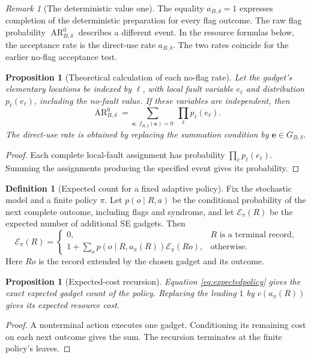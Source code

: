 \documentclass[11pt,a4paper]{article}
\newtheorem{proposition}[theorem]{Proposition}
\theoremstyle{definition}
\newtheorem{definition}[theorem]{Definition}
\theoremstyle{remark}
\newtheorem{remark}[theorem]{Remark}
\begin{document}
\begin{remark}[The deterministic value one]
The equality $a_{B,\delta}=1$ expresses completion of the deterministic
preparation for every flag outcome. The raw flag probability
$\operatorname{AR}^{0}_{B,\delta}$ describes a different event.
In the resource formulas below, the acceptance rate is the direct-use
rate $a_{B,\delta}$. The two rates coincide for the earlier no-flag
acceptance test.
\end{remark}

\begin{proposition}[Theoretical calculation of each no-flag rate]
Let the gadget's elementary locations be indexed by $\ell$, with local
fault variable $e_\ell$ and distribution $p_\ell(e_\ell)$, including the
no-fault value. If these variables are independent, then
\begin{equation}
 \operatorname{AR}^{0}_{B,\delta}
 =\sum_{\mathbf e:\,f_{B,\delta}(\mathbf e)=0}
             \ \prod_\ell p_\ell(e_\ell).
 \label{eq:ARsum}
\end{equation}
The direct-use rate is obtained by replacing the summation condition by
$\mathbf e\in G_{B,\delta}$.
\end{proposition}
\begin{proof}
Each complete local-fault assignment has probability
$\prod_\ell p_\ell(e_\ell)$. Summing the assignments producing the
specified event gives its probability.
\end{proof}

\begin{definition}[Expected count for a fixed adaptive policy]
Fix the stochastic model and a finite policy $\pi$.
Let $p(o\mid R,a)$ be the conditional probability of the next complete
outcome, including flags and syndrome, and let $\mathcal E_\pi(R)$ be the
expected number of additional SE gadgets. Then
\begin{equation}
 \mathcal E_\pi(R)=
 \begin{cases}
 0,&R\text{ is a terminal record},\\[2pt]
 \displaystyle 1+\sum_o p(o\mid R,a_\pi(R))
                    \mathcal E_\pi(Ro),&\text{otherwise}.
 \end{cases}
 \label{eq:expectedpolicy}
\end{equation}
Here $Ro$ is the record extended by the chosen gadget and its outcome.
\end{definition}

\begin{proposition}[Expected-cost recursion]
Equation \eqref{eq:expectedpolicy} gives the exact expected gadget
count of the policy. Replacing the leading $1$ by $c(a_\pi(R))$
gives its expected resource cost.
\end{proposition}
\begin{proof}
A nonterminal action executes one gadget. Conditioning its remaining
cost on each next outcome gives the sum. The recursion terminates at
the finite policy's leaves.
\end{proof}
\end{document}
